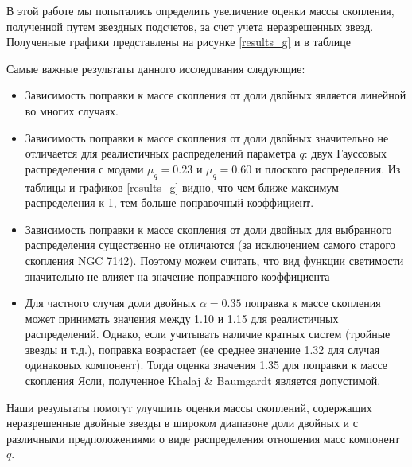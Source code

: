 \documentclass[a4paper,12pt]{article}
\begin{document}
В этой работе мы попытались определить увеличение оценки массы скопления, полученной путем звездных подсчетов, за счет учета неразрешенных звезд. Полученные графики представлены на рисунке \ref{results_g} и в таблице 

Самые важные результаты данного исследования следующие:

\begin{itemize}
	\item Зависимость поправки к массе скопления от доли двойных является линейной во многих случаях.
	\item Зависимость поправки к массе скопления от доли двойных значительно не отличается для реалистичных распределений параметра $q$: двух Гауссовых распределения с модами $\mu_q = 0.23$ и $\mu_q = 0.60$ и плоского распределения. Из таблицы и графиков \ref{results_g} видно, что чем ближе максимум распределения к 1, тем больше поправочный коэффициент.
	\item Зависимость поправки к массе скопления от доли двойных для выбранного распределения существенно не отличаются (за исключением самого старого скопления NGC 7142). Поэтому можем считать, что вид функции светимости значительно не влияет на значение поправчного коэффициента
	\item Для частного случая доли двойных $\alpha =0.35$  поправка к массе скопления может принимать значения между 1.10 и 1.15 для реалистичных распределений. Однако, если учитывать наличие кратных систем (тройные звезды и т.д.), поправка возрастает (ее среднее значение 1.32 для случая одинаковых компонент). Тогда оценка значения 1.35 для поправки к массе скопления Ясли, полученное Khalaj \& Baumgardt \cite{Khalaj} является допустимой.

\end{itemize}

Наши результаты помогут улучшить оценки массы скоплений, содержащих неразрешенные двойные звезды в широком диапазоне доли двойных и с различными предположениями о виде распределения отношения масс компонент $q$.

	\newpage
	
\end{document}
